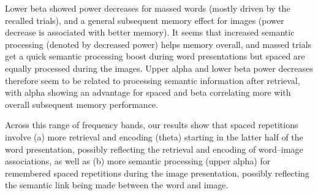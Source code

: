 Lower beta showed power decreases for massed words (mostly driven by the recalled trials), and a general subsequent memory effect for images (power decrease is associated with better memory).  It seems that increased semantic processing (denoted by decreased power) helps memory overall, and massed trials get a quick semantic processing boost during word presentations but spaced are equally processed during the images.  Upper alpha and lower beta power decreases therefore seem to be related to processing semantic information after retrieval, with alpha showing an advantage for spaced and beta correlating more with overall subsequent memory performance.

\cbstart
Across this range of frequency bands, our results show that spaced repetitions involve (a) more retrieval and encoding (theta) starting in the latter half of the word presentation, possibly reflecting the retrieval and encoding of word--image associations, as well as (b) more semantic processing (upper alpha) for remembered spaced repetitions during the image presentation, possibly reflecting the semantic link being made between the word and image.
\cbend






